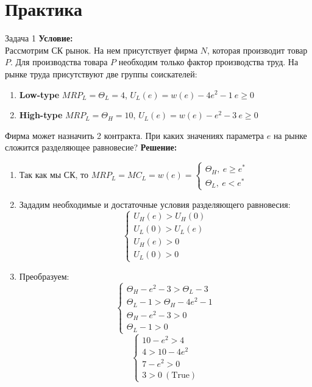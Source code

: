 \section{Практика}
\begin{mybox}{Задача 1}
\indent\setlength{\parindent}{1em}\textbf{Условие:}\\
\indent\setlength{\parindent}{1em}Рассмотрим СК рынок. На нем присутствует фирма $N$, которая производит товар $P$. Для производства товара $P$ необходим только фактор производства труд. На рынке труда присутствуют две группы соискателей: \begin{enumerate}
    \item \textbf{Low-type} $MRP_L=\Theta_L=4$, $U_L(e)=w(e)-4e^2-1 \ e\geq0$
    \item \textbf{High-type} $MRP_L=\Theta_H=10$, $U_L(e)=w(e)-e^2-3 \ e\geq0$
\end{enumerate}
\indent\setlength{\parindent}{1em}Фирма может назначить 2 контракта. При каких значениях параметра $e$ на рынке сложится разделяющее равновесие?
\tcblower
\textbf{Решение:}
\begin{enumerate}
    \item Так как мы СК, то $MRP_L=MC_L=w(e)=\begin{cases}
        \Theta_H, \ e\geq e^* \\
        \Theta_L, \ e<e^*
    \end{cases}$
    \item Зададим необходимые и достаточные условия разделяющего равновесия: $$\begin{cases}
        U_H(e)>U_H(0) \\
        U_L(0)>U_L(e) \\
        U_H(e)>0 \\
        U_L(0)>0
    \end{cases}$$
    \item Преобразуем: $$\begin{cases}
        \Theta_H-e^2-3>\Theta_L-3 \\
        \Theta_L-1>\Theta_H-4e^2-1 \\
        \Theta_H-e^2-3>0 \\
        \Theta_L-1>0
    \end{cases}$$
    $$\begin{cases}
        10-e^2>4 \\
        4>10-4e^2 \\
        7-e^2>0 \\
        3>0 \ (\text{True})
    \end{cases}$$

\end{enumerate}
\end{mybox}
